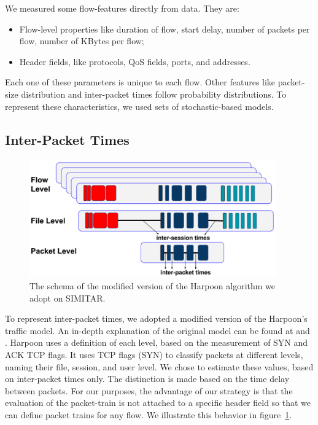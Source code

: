 We measured some flow-features directly from data. They are:

\begin{itemize}
\item Flow-level properties like duration of flow, start delay, number of packets per flow, number of KBytes per flow;
\item Header fields, like protocols, QoS fields, ports, and addresses.
\end{itemize}

Each one of these parameters is unique to each flow. Other features like packet-size distribution and inter-packet times follow probability distributions. To represent these characteristics, we used sets of stochastic-based models.

\subsection{Inter-Packet Times}


\begin{figure}[ht!]
    \centering
    \includegraphics[height=2.0in]{figures/ch3/modified-harpoon-model}
    \caption{The schema of the modified version of the Harpoon algorithm we adopt on SIMITAR.}
    \label{fig:modified-harpoon-model}
\end{figure}


To represent inter-packet times, we adopted a modified version of the Harpoon’s traffic model. An in-depth explanation of the original model can be found at  \cite{harpoon-paper} and \cite{harpoon-validation}. Harpoon uses a definition of each level, based on the measurement of SYN and ACK TCP flags. It uses TCP flags (SYN) to classify packets at different levels, naming their file, session, and user level. We chose to estimate these values, based on inter-packet times only. The distinction is made based on the time delay between packets. For our purposes, the advantage of our strategy is that the evaluation of the packet-train is not attached to a specific header field so that we can define packet trains for any flow. We illustrate this behavior in figure~\ref{fig:modified-harpoon-model}.

